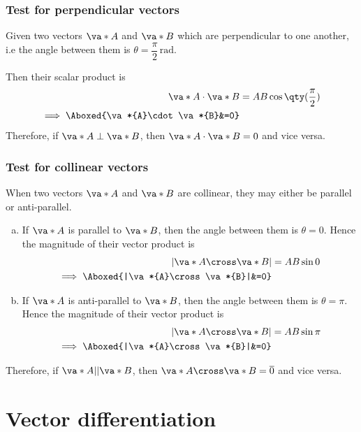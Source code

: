 		\subsubsection{Test for perpendicular vectors}
			Given two vectors $\va*{A}$ and $\va*{B}$ which are perpendicular to one another, i.e the angle between them is $\theta=\dfrac{\pi}{2}\,\unit{\radian}$.
			
			Then their scalar product is
			\begin{align*}
				\va*{A}\cdot\va*{B}&=AB\cos\qty(\dfrac{\pi}{2}) \\
				\implies\Aboxed{\va*{A}\cdot\va*{B}&=0}
			\end{align*}
			Therefore, if $\va*{A}\perp\va*{B}$, then $\va*{A}\cdot\va*{B}=0$ and vice versa.
			
		\subsubsection{Test for collinear vectors}
			When two vectors $\va*{A}$ and $\va*{B}$ are collinear, they may either be parallel or anti-parallel.
			\begin{enumerate}[a)]
				\item If $\va*{A}$ is parallel to $\va*{B}$, then the angle between them is $\theta=0$. Hence the magnitude of their vector product is
				\begin{align*}
					|\va*{A}\cross\va*{B}|&=AB\sin{0} \\
					\implies\Aboxed{|\va*{A}\cross\va*{B}|&=0}
				\end{align*}
				
				\item If $\va*{A}$ is anti-parallel to $\va*{B}$, then the angle between them is $\theta=\pi$. Hence the magnitude of their vector product is
				\begin{align*}
					|\va*{A}\cross\va*{B}|&=AB\sin{\pi} \\
					\implies\Aboxed{|\va*{A}\cross\va*{B}|&=0}
				\end{align*}
			\end{enumerate}
			Therefore, if $\va*{A}||\va*{B}$, then $\va*{A}\cross\va*{B}=\overline{0}$ and vice versa.
			
\newpage
\section{Vector differentiation}

